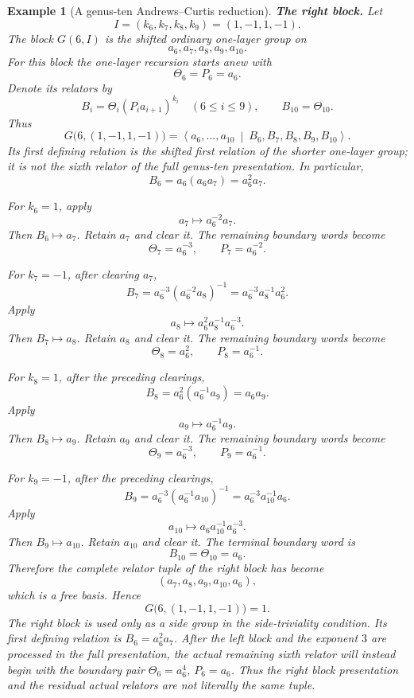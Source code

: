 \documentclass{article}
\newtheorem{example}[theorem]{Example}
\begin{document}
\begin{example}[A genus-ten Andrews--Curtis reduction]
\medskip
\noindent\textbf{The right block.}
Let
\[
 I=(k_6,k_7,k_8,k_9)=(1,-1,1,-1).
\]
The block $G(6,I)$ is the shifted ordinary one-layer group on
\[
 a_6,a_7,a_8,a_9,a_{10}.
\]
For this block the one-layer recursion starts anew with
\[
 \Theta_6=P_6=a_6.
\]
Denote its relators by
\[
 B_i=\Theta_i(P_i a_{i+1})^{k_i}
 \quad(6\leq i\leq9),
 \qquad
 B_{10}=\Theta_{10}.
\]
Thus
\[
 G\bigl(6,(1,-1,1,-1)\bigr)
 =
 \left\langle
 a_6,\ldots,a_{10}
 \ \middle|\
 B_6,B_7,B_8,B_9,B_{10}
 \right\rangle.
\]
Its first defining relation is the shifted first relation of the shorter
one-layer group; it is not the sixth relator of the full genus-ten
presentation.  In particular,
\[
 B_6=a_6(a_6a_7)=a_6^2a_7.
\]

For $k_6=1$, apply
\[
 a_7\longmapsto a_6^{-2}a_7.
\]
Then $B_6\mapsto a_7$.  Retain $a_7$ and clear it.  The remaining
boundary words become
\[
 \Theta_7=a_6^{-3},
 \qquad
 P_7=a_6^{-2}.
\]

For $k_7=-1$, after clearing $a_7$,
\[
 B_7=a_6^{-3}(a_6^{-2}a_8)^{-1}
     =a_6^{-3}a_8^{-1}a_6^2.
\]
Apply
\[
 a_8\longmapsto a_6^2a_8^{-1}a_6^{-3}.
\]
Then $B_7\mapsto a_8$.  Retain $a_8$ and clear it.  The remaining
boundary words become
\[
 \Theta_8=a_6^2,
 \qquad
 P_8=a_6^{-1}.
\]

For $k_8=1$, after the preceding clearings,
\[
 B_8=a_6^2(a_6^{-1}a_9)=a_6a_9.
\]
Apply
\[
 a_9\longmapsto a_6^{-1}a_9.
\]
Then $B_8\mapsto a_9$.  Retain $a_9$ and clear it.  The remaining
boundary words become
\[
 \Theta_9=a_6^{-3},
 \qquad
 P_9=a_6^{-1}.
\]

For $k_9=-1$, after the preceding clearings,
\[
 B_9=a_6^{-3}(a_6^{-1}a_{10})^{-1}
     =a_6^{-3}a_{10}^{-1}a_6.
\]
Apply
\[
 a_{10}\longmapsto a_6a_{10}^{-1}a_6^{-3}.
\]
Then $B_9\mapsto a_{10}$.  Retain $a_{10}$ and clear it.  The terminal
boundary word is
\[
 \boxed{B_{10}=\Theta_{10}=a_6.}
\]
Therefore the complete relator tuple of the right block has become
\[
 (a_7,a_8,a_9,a_{10},a_6),
\]
which is a free basis.  Hence
\[
 \boxed{G\bigl(6,(1,-1,1,-1)\bigr)=1.}
\]
The right block is used only as a side group in the side-triviality
condition.  Its first defining relation is $B_6=a_6^2a_7$.  After the
left block and the exponent $3$ are processed in the full presentation,
the actual remaining sixth relator will instead begin with the boundary
pair $\Theta_6=a_6^4$, $P_6=a_6$.  Thus the right block presentation and
the residual actual relators are not literally the same tuple.


\end{example}
\end{document}
